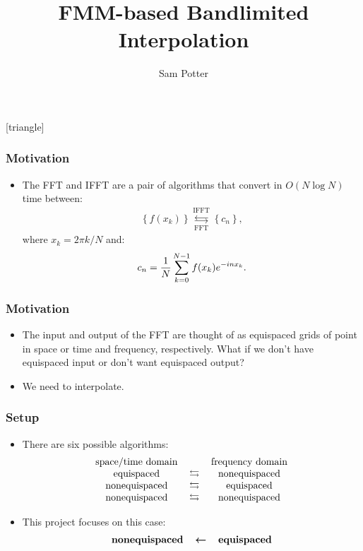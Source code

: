 \documentclass{beamer}
\title{FMM-based Bandlimited Interpolation}
\author{Sam Potter}
\newcommand{\set}[1]{\left\{#1\right\}}
\begin{document}
[triangle]

\frame{\titlepage}

\begin{frame}
  \frametitle{Motivation}
  \begin{itemize}
  \item The FFT and IFFT are a pair of algorithms that convert in
    $O(N \log N)$ time between:
    \begin{align*}
      \set{f(x_k)} \underset{\operatorname{FFT}}{\overset{\operatorname{IFFT}}{\leftrightarrows}} \set{c_n},
    \end{align*}
    where $x_k = 2\pi k/N$ and:
    \begin{align*}
      c_n = {1 \over N} \sum_{k=0}^{N-1} f(x_k) e^{-inx_k}.
    \end{align*}
  \end{itemize}
\end{frame}

\begin{frame}
  \frametitle{Motivation}
  \begin{itemize}
  \item The input and output of the FFT are thought of as equispaced
    grids of point in space or time and frequency, respectively. What
    if we don't have equispaced input or don't want equispaced output?
    \pause
  \item We need to interpolate.
  \end{itemize}
\end{frame}

\begin{frame}
  \frametitle{Setup}
  \begin{itemize}
  \item There are six possible algorithms:
    \begin{align*}
      \begin{tabular}{ccc}
        space/time domain & & frequency domain \\
        equispaced & $\leftrightarrows$ & nonequispaced \\
        nonequispaced & $\leftrightarrows$ & equispaced \\
        nonequispaced & $\leftrightarrows$ & nonequispaced
      \end{tabular}
    \end{align*}
  \item This project focuses on this case:
    \begin{align*}
      \begin{tabular}{ccc}
        \textbf{nonequispaced} & $\boldsymbol{\leftarrow}$ & \textbf{equispaced}
      \end{tabular}      
    \end{align*}
  \end{itemize}
\end{frame}
\end{document}
